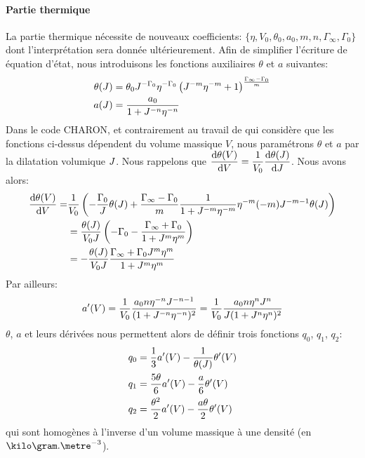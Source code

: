 \documentclass[10pt]{book}
\begin{document}
\paragraph{Partie thermique} La partie thermique \cite{lozano2023analytic} nécessite de nouveaux coefficients: $\{\eta, V_{0}, \theta_{0}, a_{0}, m, n,\Gamma_{\infty},\Gamma_{0}\}$ dont l'interprétation sera donnée ultérieurement. Afin de simplifier l'écriture de équation d'état, nous introduisons les fonctions auxiliaires $\theta$ et $a$ suivantes:
\begin{equation}
\begin{aligned}
\theta(J)&=\theta_{0}J^{-\Gamma_{0}}\eta^{-\Gamma_{0}}\left(J^{-m}\eta^{-m}+1\right)^{\frac{\Gamma_{\infty}-\Gamma_{0}}{m}}\\
a(J)&=\dfrac{a_{0}}{1+J^{-n}\eta^{-n}}
\end{aligned}
\label{eq:theta_J_a_J_MACAW}
\end{equation}
Dans le code CHARON, et contrairement au travail de \cite{lozano2022robust} qui considère que les fonctions ci-dessus dépendent du volume massique $V$, nous paramétrons $\theta$ et $a$ par la dilatation volumique $J$. Nous rappelons que $\dfrac{\mathrm{d}\theta(V)}{\mathrm{d} V}=\dfrac{1}{V_{0}}\dfrac{\mathrm{d}\theta(J)}{\mathrm{d}J}$. Nous avons alors:
\begin{equation}
\begin{aligned}
\dfrac{\mathrm{d}\theta(V)}{\mathrm{d} V}=&\dfrac{1}{V_{0}}\left(-\dfrac{\Gamma_{0}}{J}\theta(J)+\dfrac{\Gamma_{\infty}-\Gamma_{0}}{m}\dfrac{1}{1+J^{-m}\eta^{-m}}\eta^{-m}(-m)J^{-m-1}\theta(J)\right)\\
&=\dfrac{\theta(J)}{V_{0}J}\left(-\Gamma_{0}-\dfrac{\Gamma_{\infty}+\Gamma_{0}}{1+J^{m}\eta^{m}}\right)\\
&=-\dfrac{\theta(J)}{V_{0}J}\dfrac{\Gamma_{\infty}+\Gamma_{0}J^{m}\eta^{m}}{1+J^{m}\eta^{m}}
\end{aligned}
\label{eq:deriv_theta_J_MACAW}
\end{equation}
Par ailleurs:
\begin{equation}
a'(V)=\dfrac{1}{V_{0}}\dfrac{a_{0}n\eta^{-n}J^{-n-1}}{(1+J^{-n}\eta^{-n})^{2}}=\dfrac{1}{V_{0}}\dfrac{a_{0}n\eta^{n}J^{n}}{J(1+J^{n}\eta^{n})^{2}}
\label{eq:deriv_aJ_MACAW}
\end{equation}
$\theta$, $a$ et leurs dérivées nous permettent alors de définir trois fonctions $q_{0}$, $q_{1}$, $q_{2}$:
$$\begin{aligned}
q_{0}&=\dfrac{1}{3}a'(V)-\dfrac{1}{\theta(J)}\theta'(V)\\
q_{1}&=\dfrac{5\theta}{6}a'(V)-\dfrac{a}{6}\theta'(V)\\
q_{2}&=\dfrac{\theta^{2}}{2}a'(V)-\dfrac{a\theta}{2}\theta'(V)\\
\end{aligned}$$
qui sont homogènes à l'inverse d'un volume massique \ie à une densité (en $\kilo\gram.\metre^{-3}$).
\end{document}
